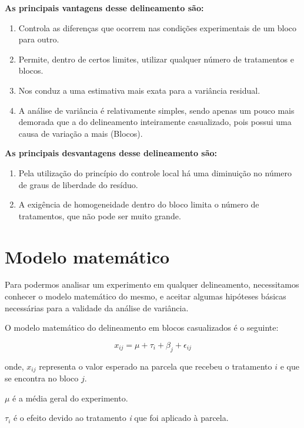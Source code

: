 \documentclass[
]{book}
\begin{document}
\textbf{As principais vantagens desse delineamento são:}

\begin{enumerate}
\def\labelenumi{\arabic{enumi}.}
\item
  Controla as diferenças que ocorrem nas condições experimentais de um bloco para outro.
\item
  Permite, dentro de certos limites, utilizar qualquer número de tratamentos e blocos.
\item
  Nos conduz a uma estimativa mais exata para a variância residual.
\item
  A análise de variância é relativamente simples, sendo apenas um pouco mais demorada que a do delineamento inteiramente casualizado, pois possui uma causa de variação a mais (Blocos).
\end{enumerate}

\textbf{As principais desvantagens desse delineamento são:}

\begin{enumerate}
\def\labelenumi{\arabic{enumi}.}
\item
  Pela utilização do princípio do controle local há uma diminuição no número de graus de liberdade do resíduo.
\item
  A exigência de homogeneidade dentro do bloco limita o número de tratamentos, que não pode ser muito grande.
\end{enumerate}

\hypertarget{modelo-matemuxe1tico-1}{%
\section{Modelo matemático}\label{modelo-matemuxe1tico-1}}

Para podermos analisar um experimento em qualquer delineamento, necessitamos conhecer o modelo matemático do mesmo, e aceitar algumas hipóteses básicas necessárias para a validade da análise de variância.

O modelo matemático do delineamento em blocos casualizados é o seguinte:

\[
x_{ij} = \mu +\tau_i + \beta_j+\epsilon_{ij}
\]

onde,
\(x_{ij}\) representa o valor esperado na parcela que recebeu o tratamento \(i\) e que se encontra no bloco \(j\).

\(\mu\) é a média geral do experimento.

\(\tau_i\) é o efeito devido ao tratamento \emph{i} que foi aplicado à parcela.
\end{document}
